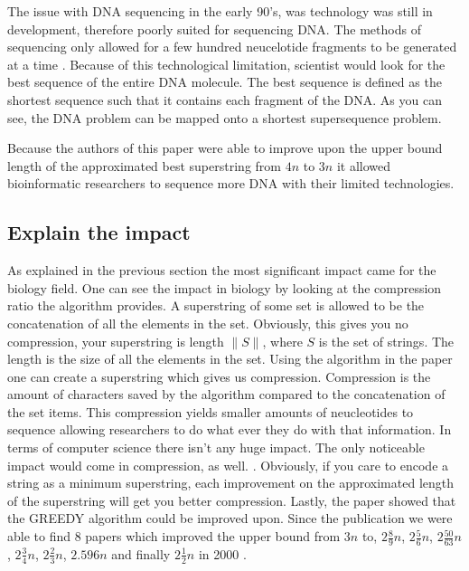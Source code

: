 \documentclass[letterpaper,11pt,titlepage]{article}
\begin{document}
The issue with DNA sequencing in the early 90's, was technology was still in development, therefore poorly suited for sequencing DNA. The methods of sequencing only allowed for a few hundred neucelotide fragments to be generated at a time \cite{karp1993mapping}. Because of this technological limitation, scientist would look for the best sequence of the entire DNA molecule. The best sequence is defined as the shortest sequence such that it contains each fragment of the DNA. As you can see, the DNA problem can be mapped onto a shortest supersequence problem. 

Because the authors of this paper were able to improve upon the upper bound length of the approximated best superstring from $4n$ to $3n$ it allowed bioinformatic researchers to sequence more DNA with their limited technologies. 



\subsection*{Explain the impact}
As explained in the previous section the most significant impact came for the biology field. One can see the impact in biology by looking at the compression ratio the algorithm provides. A superstring of some set is allowed to be the concatenation of all the elements in the set. Obviously, this gives you no compression, your superstring is length $\| S \|$, where $S$ is the set of strings. The length is the size of all the elements in the set. Using the algorithm in the paper one can create a superstring which gives us compression. Compression is the amount of characters saved by the algorithm compared to the concatenation of the set items. This compression yields smaller amounts of neucleotides to sequence allowing researchers to do what ever they do with that information.  In terms of computer science there isn't any huge impact.  The only noticeable impact would come in compression, as well. \cite{storer1988data}. Obviously, if you care to encode a string as a minimum superstring, each improvement on the approximated length of the superstring will get you better compression. Lastly, the paper showed that the GREEDY algorithm could be improved upon. Since the publication we were able to find 8 papers which improved the upper bound from $3n$ to, $2 \frac{8}{9}n$, $2 \frac{5}{6}n$, $2 \frac{50}{63}n$, $2 \frac{3}{4}n$, $2 \frac{2}{3}n$, $2.596n$ and finally $2 \frac{1}{2}n$ in 2000 \cite{sweedyk2000boldmath}.
\end{document}
